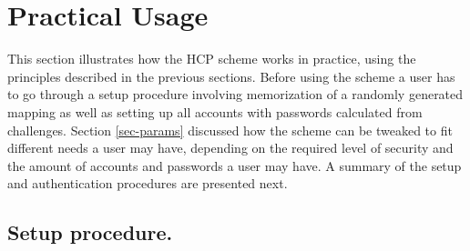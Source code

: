\section{Practical Usage}\label{usage}
This section illustrates how the HCP scheme works in practice, using the principles described in the previous sections. Before using the scheme a user has to go through a setup procedure involving memorization of a randomly generated mapping as well as setting up all accounts with passwords calculated from challenges. Section \ref{sec-params} discussed how the scheme can be tweaked to fit different needs a user may have, depending on the required level of security and the amount of accounts and passwords a user may have. A summary of the setup and authentication procedures are presented next.
\subsection{Setup procedure.}
